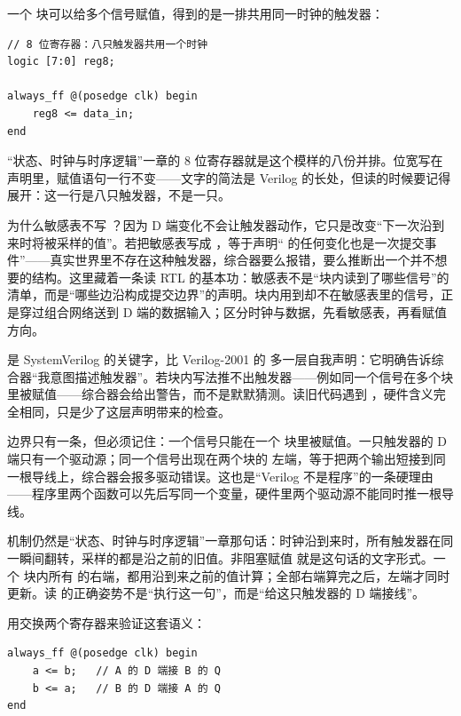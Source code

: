 一个  块可以给多个信号赋值，得到的是一排共用同一时钟的触发器：

\begin{lstlisting}
// 8 位寄存器：八只触发器共用一个时钟
logic [7:0] reg8;

always_ff @(posedge clk) begin
    reg8 <= data_in;
end
\end{lstlisting}

“状态、时钟与时序逻辑”一章的 8 位寄存器就是这个模样的八份并排。位宽写在声明里，赋值语句一行不变——文字的简法是 Verilog 的长处，但读的时候要记得展开：这一行是八只触发器，不是一只。

为什么敏感表不写 ？因为 D 端变化不会让触发器动作，它只是改变“下一次沿到来时将被采样的值”。若把敏感表写成 ，等于声明“ 的任何变化也是一次提交事件”——真实世界里不存在这种触发器，综合器要么报错，要么推断出一个并不想要的结构。这里藏着一条读 RTL 的基本功：敏感表不是“块内读到了哪些信号”的清单，而是“哪些边沿构成提交边界”的声明。块内用到却不在敏感表里的信号，正是穿过组合网络送到 D 端的数据输入；区分时钟与数据，先看敏感表，再看赋值方向。

 是 SystemVerilog 的关键字，比 Verilog-2001 的  多一层自我声明：它明确告诉综合器“我意图描述触发器”。若块内写法推不出触发器——例如同一个信号在多个块里被赋值——综合器会给出警告，而不是默默猜测。读旧代码遇到 ，硬件含义完全相同，只是少了这层声明带来的检查。

边界只有一条，但必须记住：一个信号只能在一个  块里被赋值。一只触发器的 D 端只有一个驱动源；同一个信号出现在两个块的 \code{<=} 左端，等于把两个输出短接到同一根导线上，综合器会报多驱动错误。这也是“Verilog 不是程序”的一条硬理由——程序里两个函数可以先后写同一个变量，硬件里两个驱动源不能同时推一根导线。


机制仍然是“状态、时钟与时序逻辑”一章那句话：时钟沿到来时，所有触发器在同一瞬间翻转，采样的都是沿之前的旧值。非阻塞赋值 \code{<=} 就是这句话的文字形式。一个  块内所有 \code{<=} 的右端，都用沿到来之前的值计算；全部右端算完之后，左端才同时更新。读 \code{<=} 的正确姿势不是“执行这一句”，而是“给这只触发器的 D 端接线”。

用交换两个寄存器来验证这套语义：

\begin{lstlisting}
always_ff @(posedge clk) begin
    a <= b;   // A 的 D 端接 B 的 Q
    b <= a;   // B 的 D 端接 A 的 Q
end
\end{lstlisting}

